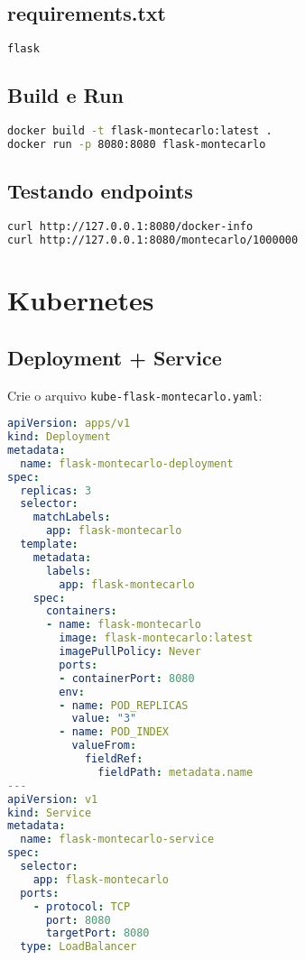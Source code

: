 \documentclass[a4paper,12pt]{article}
\begin{document}
\subsection{requirements.txt}

\begin{lstlisting}[language=bash]
flask
\end{lstlisting}

\subsection{Build e Run}

\begin{lstlisting}[language=bash]
docker build -t flask-montecarlo:latest .
docker run -p 8080:8080 flask-montecarlo
\end{lstlisting}

\subsection{Testando endpoints}

\begin{lstlisting}[language=bash]
curl http://127.0.0.1:8080/docker-info
curl http://127.0.0.1:8080/montecarlo/1000000
\end{lstlisting}

\section{Kubernetes}

\subsection{Deployment + Service}

Crie o arquivo \texttt{kube-flask-montecarlo.yaml}:

\begin{lstlisting}[language=yaml]
apiVersion: apps/v1
kind: Deployment
metadata:
  name: flask-montecarlo-deployment
spec:
  replicas: 3
  selector:
    matchLabels:
      app: flask-montecarlo
  template:
    metadata:
      labels:
        app: flask-montecarlo
    spec:
      containers:
      - name: flask-montecarlo
        image: flask-montecarlo:latest
        imagePullPolicy: Never
        ports:
        - containerPort: 8080
        env:
        - name: POD_REPLICAS
          value: "3"
        - name: POD_INDEX
          valueFrom:
            fieldRef:
              fieldPath: metadata.name
---
apiVersion: v1
kind: Service
metadata:
  name: flask-montecarlo-service
spec:
  selector:
    app: flask-montecarlo
  ports:
    - protocol: TCP
      port: 8080
      targetPort: 8080
  type: LoadBalancer
\end{lstlisting}
\end{document}
